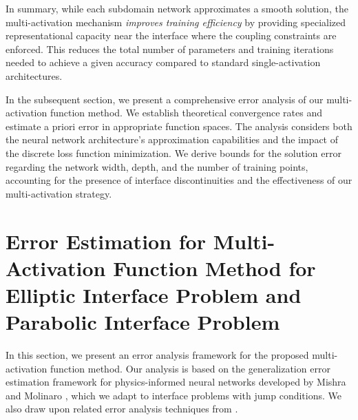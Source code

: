 \documentclass{article}
\newtheorem{remark}{Remark}[section]
\begin{document}
In summary, while each subdomain network approximates a smooth solution, the multi-activation mechanism \emph{improves training efficiency} by providing specialized representational capacity near the interface where the coupling constraints are enforced. This reduces the total number of parameters and training iterations needed to achieve a given accuracy compared to standard single-activation architectures.



In the subsequent section, we present a comprehensive error analysis of our multi-activation function method. We establish theoretical convergence rates and estimate a priori error in appropriate function spaces. The analysis considers both the neural network architecture's approximation capabilities and the impact of the discrete loss function minimization. We derive bounds for the solution error regarding the network width, depth, and the number of training points, accounting for the presence of interface discontinuities and the effectiveness of our multi-activation strategy.

\section{Error Estimation for Multi-Activation Function Method for Elliptic Interface Problem and Parabolic Interface Problem}
\label{sec:error-estimation}

In this section, we present an error analysis framework for the proposed multi-activation function method. Our analysis is based on the generalization error estimation framework for physics-informed neural networks developed by Mishra and Molinaro \cite{mishra2023estimates}, which we adapt to interface problems with jump conditions. We also draw upon related error analysis techniques from \cite{de2022error, zhang2024priori}.
\end{document}
